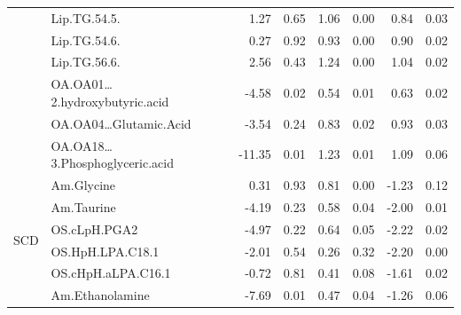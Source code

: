 \documentclass{amsart}
\begin{document}
\begin{table}
\begin{tabular}{clrrrrrr}
 & Lip.TG.54.5. & {\cellcolor[rgb]{0.722,0.843,0.643}}1.27 & 0.65 & {\cellcolor[rgb]{0.769,0.871,0.702}}1.06 & 0.00 & {\cellcolor[rgb]{0.82,0.898,0.765}}0.84 & 0.03 \\
 & Lip.TG.54.6. & {\cellcolor[rgb]{0.945,0.969,0.925}}0.27 & 0.92 & {\cellcolor[rgb]{0.796,0.886,0.737}}0.93 & 0.00 & {\cellcolor[rgb]{0.804,0.89,0.749}}0.90 & 0.02 \\
 & Lip.TG.56.6. & {\cellcolor[rgb]{0.439,0.678,0.278}}2.56 & 0.43 & {\cellcolor[rgb]{0.729,0.847,0.655}}1.24 & 0.00 & {\cellcolor[rgb]{0.773,0.871,0.706}}1.04 & 0.02 \\
 & OA.OA01…2.hydroxybutyric.acid & {\cellcolor[rgb]{0.898,0.678,0.686}}-4.58 & 0.02 & {\cellcolor[rgb]{0.882,0.933,0.847}}0.54 & 0.01 & {\cellcolor[rgb]{0.863,0.922,0.824}}0.63 & 0.02 \\
 & OA.OA04…Glutamic.Acid & {\cellcolor[rgb]{0.922,0.753,0.757}}-3.54 & 0.24 & {\cellcolor[rgb]{0.82,0.898,0.769}}0.83 & 0.02 & {\cellcolor[rgb]{0.8,0.886,0.741}}0.93 & 0.03 \\
 & OA.OA18…3.Phosphoglyceric.acid & {\cellcolor[rgb]{0.749,0.212,0.231}}-11.35 & 0.01 & {\cellcolor[rgb]{0.733,0.847,0.655}}1.23 & 0.01 & {\cellcolor[rgb]{0.761,0.863,0.694}}1.09 & 0.06 \\ \midrule
\multirow{17}{0.056\linewidth}{\hspace{0pt}\Centering{}SCD} & Am.Glycine & {\cellcolor[rgb]{0.933,0.961,0.914}}0.31 & 0.93 & {\cellcolor[rgb]{0.824,0.902,0.773}}0.81 & 0.00 & {\cellcolor[rgb]{0.973,0.914,0.914}}-1.23 & 0.12 \\
 & Am.Taurine & {\cellcolor[rgb]{0.906,0.706,0.714}}-4.19 & 0.23 & {\cellcolor[rgb]{0.875,0.929,0.839}}0.58 & 0.04 & {\cellcolor[rgb]{0.953,0.859,0.863}}-2.00 & 0.01 \\
 & OS.cLpH.PGA2 & {\cellcolor[rgb]{0.886,0.651,0.663}}-4.97 & 0.22 & {\cellcolor[rgb]{0.863,0.922,0.82}}0.64 & 0.05 & {\cellcolor[rgb]{0.949,0.843,0.847}}-2.22 & 0.02 \\
 & OS.HpH.LPA.C18.1 & {\cellcolor[rgb]{0.953,0.859,0.863}}-2.01 & 0.54 & {\cellcolor[rgb]{0.945,0.969,0.929}}0.26 & 0.32 & {\cellcolor[rgb]{0.949,0.847,0.851}}-2.20 & 0.00 \\
 & OS.cHpH.aLPA.C16.1 & {\cellcolor[rgb]{0.98,0.949,0.949}}-0.72 & 0.81 & {\cellcolor[rgb]{0.914,0.949,0.886}}0.41 & 0.08 & {\cellcolor[rgb]{0.961,0.886,0.89}}-1.61 & 0.02 \\
 & Am.Ethanolamine & {\cellcolor[rgb]{0.827,0.463,0.478}}-7.69 & 0.01 & {\cellcolor[rgb]{0.898,0.941,0.867}}0.47 & 0.04 & {\cellcolor[rgb]{0.969,0.91,0.914}}-1.26 & 0.06 \\

\end{tabular}
\end{table}
\end{document}
